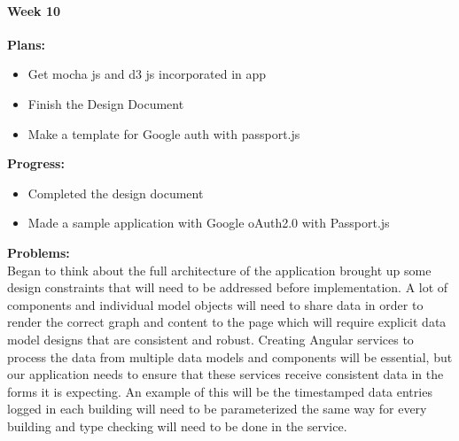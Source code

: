 \paragraph{Week 10}
\begin{adjustwidth}{2.5em}{0pt}
    \vspace{-0.5cm}\textbf{Plans:}
    \vspace{-0.5cm}
    \begin{itemize}
        \item Get mocha js and d3 js incorporated in app
        \item Finish the Design Document
        \item Make a template for Google auth with passport.js 
    \end{itemize} 
    \vspace{-0.3cm}\textbf{Progress:}
    \vspace{-0.5cm}
    \begin{itemize}
        \item Completed the design document
        \item Made a sample application with Google oAuth2.0 with Passport.js
    \end{itemize} 
    \vspace{-0.3cm}\textbf{Problems:}\\
    Began to think about the full architecture of the application brought up some design constraints that will need to be addressed before implementation. A lot of components and individual model objects will need to share data in order to render the correct graph and content to the page which will require explicit data model designs that are consistent and robust. Creating Angular services to process the data from multiple data models and components will be essential, but our application needs to ensure that these services receive consistent data in the forms it is expecting. An example of this will be the timestamped data entries logged in each building will need to be parameterized the same way for every building and type checking will need to be done in the service. \\


\end{adjustwidth}
